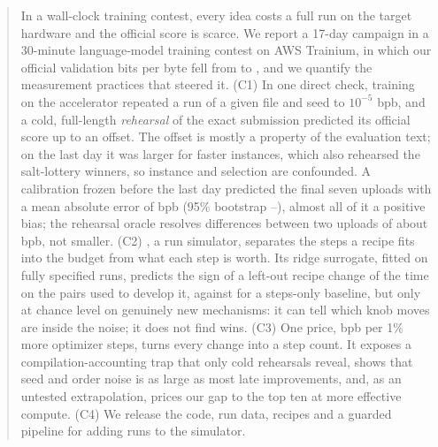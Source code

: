 \begin{abstract}
In a wall-clock training contest, every idea costs a full run on the target hardware and the official score is
scarce. We report a 17-day campaign in a 30-minute language-model training contest on AWS Trainium, in which our
official validation bits per byte fell from  to , and we quantify the
measurement practices that steered it. (C1) In one direct check, training on the accelerator repeated a run of a given
file and seed to $10^{-5}$ bpb, and a cold, full-length \emph{rehearsal} of the exact submission predicted its
official score up to an offset. The offset is mostly a property of the evaluation text; on the last day it was
larger for faster instances, which also rehearsed the salt-lottery winners, so instance and selection are
confounded. A calibration frozen before the last day predicted the final seven uploads with a mean absolute error of
 bpb (95\% bootstrap --), almost all of it a positive bias;
the rehearsal oracle resolves differences between two uploads of about  bpb, not smaller. (C2) \ffsim{}, a run
simulator, separates the steps a recipe fits into the budget from what each step is worth. Its ridge surrogate,
fitted on  fully specified runs, predicts the sign of a left-out recipe change  of the
time on the pairs used to develop it, against  for a steps-only baseline, but only at chance
level on genuinely new mechanisms: it can tell which knob moves are inside the noise; it does not find wins. (C3) One
price,  bpb per 1\% more optimizer steps, turns every change into a step count. It exposes a
compilation-accounting trap that only cold rehearsals reveal, shows that seed and order noise is as large as most
late improvements, and, as an untested extrapolation, prices our gap to the top ten at  more
effective compute. (C4) We release the code, run data, recipes and a guarded pipeline for adding runs to the simulator.
\end{abstract}
